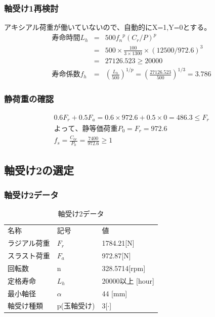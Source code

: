 \documentclass[a4j,twoside,openright,11pt]{jreport}
\begin{document}
\subsubsection{軸受け1再検討}
アキシアル荷重が働いていないので、自動的にX=1,Y=0とする。
\begin{eqnarray}
寿命時間L_h &=& 500{f_n}^p(C_r/P)^p\\
           &=& 500 \times \frac{100}{3 \times 1300} \times (12500/972.6)^3\\
           &=& 27126.523 \geq 20000\\
寿命係数f_h &=& \left( \frac{L_h}{500} \right)^{1/p} = \left( \frac{27126.523}{500} \right)^{1/3} = 3.786
\end{eqnarray}

\subsubsection{静荷重の確認}
\begin{eqnarray}
0.6F_r+0.5F_a=0.6 \times 972.6 + 0.5 \times 0 = 486.3 \leq F_r\\
よって、静等価荷重P_0 = F_r=972.6\\
f_s = \frac{C_{0r}}{P_0} = \frac{7400}{972.6}\geq 1
\end{eqnarray}








\newpage
\subsection{軸受け2の選定}
\subsubsection{軸受け2データ}
\begin{table}[htb]
\begin{center}
  \caption{軸受け2データ}
  \begin{tabular}{lll} \hline
名称&記号&値\\
ラジアル荷重&$F_r$&1784.21[N]\\
スラスト荷重&$F_a$&972.87[N]\\
回転数&n&328.5714[rpm]\\
定格寿命&$L_h$&20000以上 [hour]\\
最小軸径&$\alpha$&44 [mm]\\
軸受け種類&p(玉軸受け)&3[$\cdot$]\\
\hline
  \end{tabular}
\end{center}
\end{table}
\end{document}
